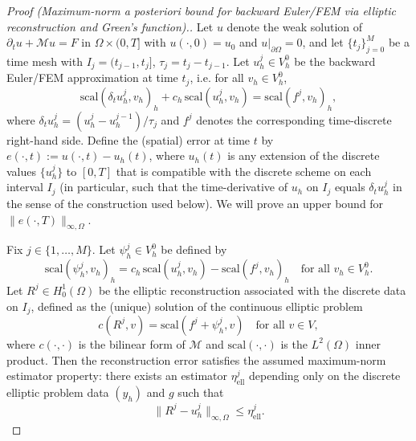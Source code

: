 \documentclass{article}
\begin{document}
\begin{proof}[Proof (Maximum-norm a posteriori bound for backward Euler/FEM via elliptic reconstruction and Green’s function).]
Let $u$ denote the weak solution of $\partial_t u+\mathcal{M}u=F$ in $\Omega\times(0,T]$ with $u(\cdot,0)=u_0$ and $u|_{\partial\Omega}=0$, and let $\{t_j\}^M_{j=0}$ be a time mesh with $I_j=(t_{j-1},t_j]$, $\tau_j=t_j-t_{j-1}$. Let $u_h^j\in V_h^0$ be the backward Euler/FEM approximation at time $t_j$, i.e. for all $v_h\in V_h^0$,
\[
\mathrm{scal}(\delta_t u_h^j,v_h)_h+c_h\,\mathrm{scal}(u_h^j,v_h)=\mathrm{scal}(f^j,v_h)_h,
\]
where $\delta_t u_h^j=(u_h^j-u_h^{j-1})/\tau_j$ and $f^j$ denotes the corresponding time-discrete right-hand side. Define the (spatial) error at time $t$ by $e(\cdot,t):=u(\cdot,t)-u_h(t)$, where $u_h(t)$ is any extension of the discrete values $\{u_h^j\}$ to $[0,T]$ that is compatible with the discrete scheme on each interval $I_j$ (in particular, such that the time-derivative of $u_h$ on $I_j$ equals $\delta_t u_h^j$ in the sense of the construction used below). We will prove an upper bound for $\|e(\cdot,T)\|_{\infty,\Omega}$.

Fix $j\in\{1,\dots,M\}$. Let $\psi_h^j\in V_h^0$ be defined by
\[
\mathrm{scal}(\psi_h^j,v_h)_h=c_h\,\mathrm{scal}(u_h^j,v_h)-\mathrm{scal}(f^j,v_h)_h
\quad\text{for all }v_h\in V_h^0.
\]
Let $R^j\in H^1_0(\Omega)$ be the elliptic reconstruction associated with the discrete data on $I_j$, defined as the (unique) solution of the continuous elliptic problem
\[
c(R^j,v)=\mathrm{scal}(f^j+\psi_h^j,v)\quad\text{for all }v\in V,
\]
where $c(\cdot,\cdot)$ is the bilinear form of $\mathcal{M}$ and $\mathrm{scal}(\cdot,\cdot)$ is the $L^2(\Omega)$ inner product. Then the reconstruction error satisfies the assumed maximum-norm estimator property: there exists an estimator $\eta^j_{\mathrm{ell}}$ depending only on the discrete elliptic problem data $(y_h)$ and $g$ such that
\[
\|R^j-u_h^j\|_{\infty,\Omega}\le \eta^j_{\mathrm{ell}}.
\]


\end{proof}
\end{document}
